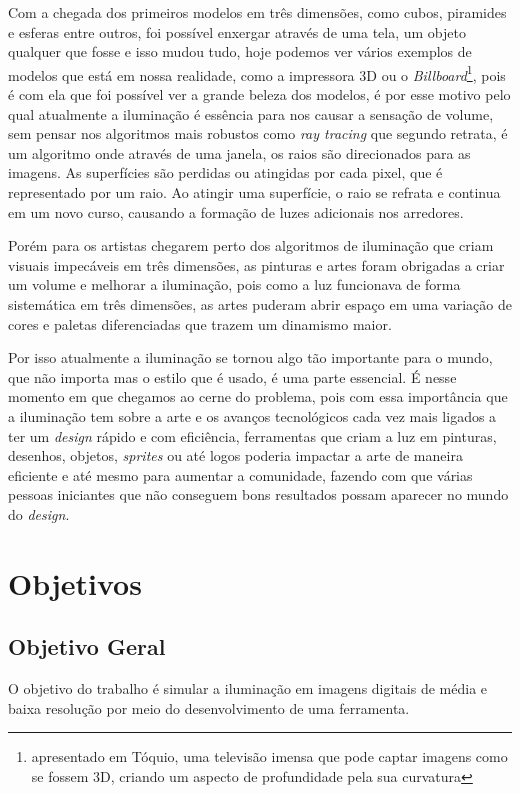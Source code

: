 Com a chegada dos primeiros modelos em três dimensões, como cubos, piramides e esferas entre outros, foi possível enxergar através de uma tela, um objeto qualquer que fosse e isso mudou tudo, hoje podemos ver vários exemplos de modelos que está em nossa realidade, como a impressora 3D ou o \textit{Billboard}\footnote{apresentado em Tóquio, uma televisão imensa que pode captar imagens como se fossem 3D, criando um aspecto de profundidade pela sua curvatura}, pois é com ela que foi possível ver a grande beleza dos modelos, é por esse motivo pelo qual atualmente a iluminação é essência para nos causar a sensação de volume, sem pensar nos algoritmos mais robustos como \textit{ray tracing} que segundo  retrata, é um algoritmo onde através de uma janela, os raios são direcionados para as imagens. As superfícies são perdidas ou atingidas por cada pixel, que é representado por um raio. Ao atingir uma superfície, o raio se refrata e continua em um novo curso, causando a formação de luzes adicionais nos arredores.

Porém para os artistas chegarem perto dos algoritmos de iluminação que criam visuais impecáveis em três dimensões, as pinturas e artes foram obrigadas a criar um volume e melhorar a iluminação, pois como a luz funcionava de forma sistemática em três dimensões, as artes puderam abrir espaço em uma variação de cores e paletas diferenciadas que trazem um dinamismo maior.

Por isso atualmente a iluminação se tornou algo tão importante para o mundo, que não importa mas o estilo que é usado, é uma parte essencial. É nesse momento em que chegamos ao cerne do problema, pois com essa importância que a iluminação tem sobre a arte e os avanços tecnológicos cada vez mais ligados a ter um \textit{design} rápido e com eficiência, ferramentas que criam a luz em pinturas, desenhos, objetos, \textit{sprites} ou até logos poderia impactar a arte de maneira eficiente e até mesmo para aumentar a comunidade, fazendo com que várias pessoas iniciantes que não conseguem bons resultados possam aparecer no mundo do \textit{design}.

\section{Objetivos}

\subsection{Objetivo Geral}
O objetivo do trabalho é simular a iluminação em imagens digitais de média e baixa resolução por meio do desenvolvimento de uma ferramenta.

